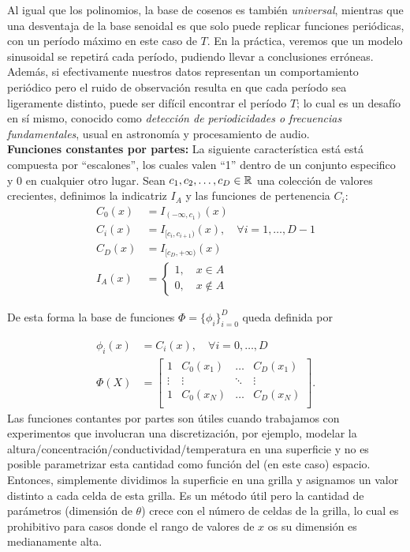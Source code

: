 Al igual que los polinomios, la base de cosenos es también \emph{universal}, mientras que una desventaja de la base senoidal es que solo puede replicar funciones periódicas, con un período máximo en este caso  de $T$. En la práctica, veremos que un modelo sinusoidal se repetirá cada período, pudiendo llevar a conclusiones erróneas. Además, si efectivamente nuestros datos representan un comportamiento periódico pero el ruido de observación resulta en que cada período sea ligeramente distinto, puede ser difícil encontrar el período $T$; lo cual es un  desafío en sí mismo, conocido como \emph{detección de periodicidades o frecuencias fundamentales}, usual en astronomía y procesamiento de audio. \\

\noindent\textbf{Funciones constantes por partes:} La siguiente característica está está compuesta por ``escalones'', los cuales valen ``1'' dentro de un conjunto especifico y 0 en cualquier otro lugar. Sean $c_1,c_2, \ldots,c_D\in{\mathbb R}$ una colección de valores crecientes, definimos la indicatriz $I_A$ y las funciones de pertenencia $C_i$:
\begin{align}
    C_0(x) &= I_{(-\infty,c_1)}(x)\\
    C_i(x) &= I_{[c_i,c_{i+1})}(x), \quad \forall i=1,\ldots,D-1\\
    C_D(x) &= I_{[c_D,+\infty)}(x)\\
    I_A(x) &= \left\{\begin{matrix}
    1,\quad x\in A\\
    0,\quad x\notin A
    \end{matrix}\right.
\end{align}
    
De esta forma la base de funciones $\Phi=\{\phi_i\}_{i=0}^D$ queda definida por
    
\begin{align}
    \phi_i(x) &= C_i(x),\quad \forall i=0,\ldots,D\\
    \Phi(X) &= \left[ \begin{matrix}
    1 & C_0(x_1) & \ldots & C_D(x_1)\\
    \vdots & \vdots  & \ddots & \vdots \\
    1 & C_0(x_N) & \ldots & C_D(x_N)\\
    \end{matrix} \right].
\end{align}
Las funciones contantes por partes son útiles cuando trabajamos con experimentos que involucran una discretización, por ejemplo, modelar la altura/concentración/conductividad/temperatura en una superficie y no es posible parametrizar esta cantidad como función del (en este caso) espacio. Entonces, simplemente dividimos la superficie en una grilla y asignamos un valor distinto a cada celda de esta grilla. Es un método útil pero la cantidad de parámetros (dimensión de $\theta$) crece con el número de celdas de la grilla, lo cual es prohibitivo para casos donde el  rango de valores de $x$ os su dimensión es medianamente alta. 
    

